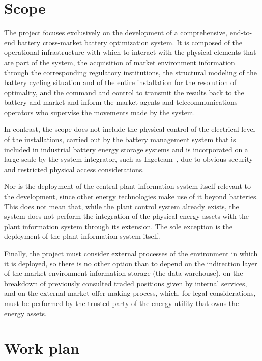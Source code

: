 \section*{Scope}%
\label{makereference9.2}

The project focuses exclusively on the development of a comprehensive, end-to-end battery cross-market battery optimization system. It is composed of the operational infrastructure with which to interact with the physical elements that are part of the system, the acquisition of market environment information through the corresponding regulatory institutions, the structural modeling of the battery cycling situation and of the entire installation for the resolution of optimality, and the command and control to transmit the results back to the battery and market and inform the market agents and telecommunications operators who supervise the movements made by the system.

In contrast, the scope does not include the physical control of the electrical level of the installations, carried out by the battery management system that is included in industrial battery energy storage systems and is incorporated on a large scale by the system integrator, such as Ingeteam~\cite{ingeteam2022ingeteam}, due to obvious security and restricted physical access considerations.

Nor is the deployment of the central plant information system itself relevant to the development, since other energy technologies make use of it beyond batteries. This does not mean that, while the plant control system already exists, the system does not perform the integration of the physical energy assets with the plant information system through its extension. The sole exception is the deployment of the plant information system itself.

Finally, the project must consider external processes of the environment in which it is deployed, so there is no other option than to depend on the indirection layer of the market environment information storage (the data warehouse), on the breakdown of previously consulted traded positions given by internal services, and on the external market offer making process, which, for legal considerations, must be performed by the trusted party of the energy utility that owns the energy assets.

\section*{Work plan}%
\label{makereference9.3}

